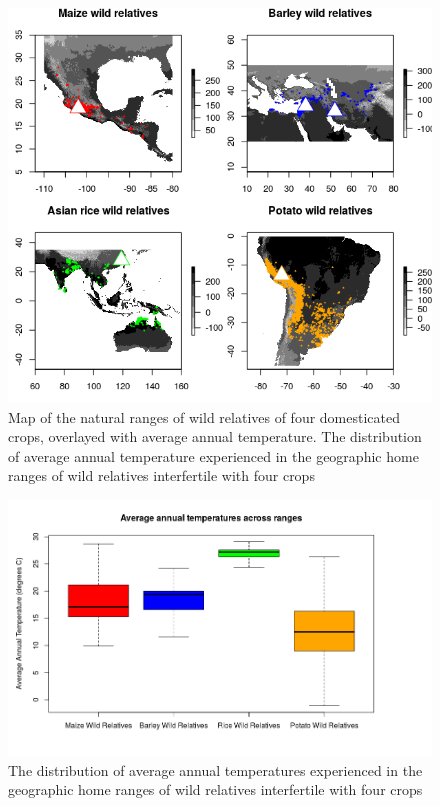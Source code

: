 \documentclass[11pt]{article}
\begin{document}

\begin{figure}[h]
	\centering
	\includegraphics[width=17.35cm]{temperature_plot.png}
	\caption{Map of the natural ranges of wild relatives of four domesticated crops, overlayed with average annual temperature. The distribution of average annual temperature experienced in the geographic home ranges of wild relatives interfertile with four crops}
	\label{fig:map}
\end{figure}

\begin{figure}[h]
	\centering
	\includegraphics[width=17.35cm]{boxplot.png}
	\caption{The distribution of average annual temperatures experienced in the geographic home ranges of wild relatives interfertile with four crops}
	\label{fig:map}
\end{figure}
\end{document}
